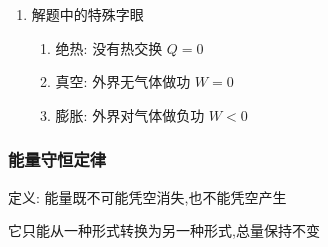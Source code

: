 \documentclass{article}
\begin{document}
\begin{enumerate}[label = \arabic*]
\begin{enumerate}[label = (\arabic*)]
\begin{enumerate}[label = (\alph*)]
\begin{minipage}{0.8\textwidth}
                                  同质量的$0^{\circ}C$水和$0^{\circ}C$冰,后者吸热变成水,因此前者内能更大
                              \end{minipage}
                        \item 研究对象为 \textbf{理想气体} \, 时

                              $m$一定时,理想气体无分子势能,其内能只和温度有关
                    \end{enumerate}
              \item 做功公式: $W = P \vdot \triangle V \, $(恒压 or $\overline{P}$ or $P-V$图像面积)
          \end{enumerate}
    \item 解题中的特殊字眼
          \begin{enumerate}[label = (\arabic*)]
              \item 绝热: 没有热交换 $Q = 0$
              \item 真空: 外界无气体做功 $W = 0$
              \item 膨胀: 外界对气体做负功 $W < 0$
          \end{enumerate}
\end{enumerate}

\vspace{2em}

\subsubsection{能量守恒定律}

定义: 能量既不可能凭空消失,也不能凭空产生

\hspace{2.7em}它只能从一种形式转换为另一种形式,总量保持不变
\end{document}
